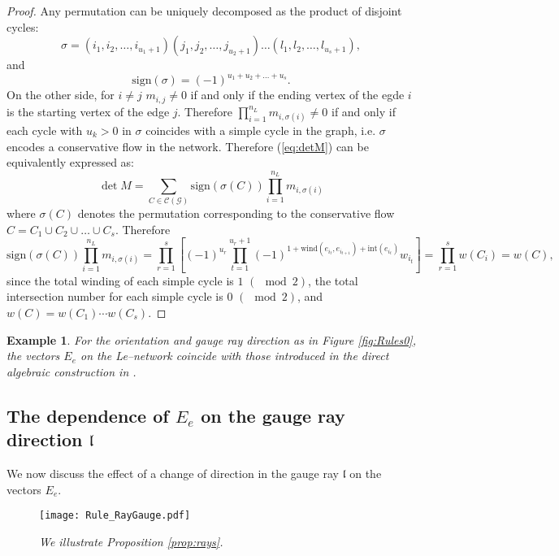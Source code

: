 \documentclass[11pt]{amsart}
\theoremstyle{plain}
\numberwithin{equation}{section}
\newtheorem{example}{Example}[subsection]
\begin{document}
\begin{proof}
Any permutation can be uniquely decomposed as the product of disjoint cycles: 
$$
\sigma=(i_1,i_2,\ldots,i_{u_1+1})(j_1,j_2,\ldots,j_{u_2+1})\ldots(l_1,l_2,\ldots,l_{u_s+1}),
$$ 
and
$$
\mbox{sign}(\sigma)=(-1)^{u_1+u_2+\ldots+u_s}.
$$
On the other side, for $i\ne j$ $m_{i,j}\ne 0$ if and only if the ending vertex of the egde $i$ is the starting vertex of the edge $j$. Therefore $\prod\limits_{i=1}^{n_L} m_{i,\sigma(i)} \ne 0$ if and only if each cycle with $u_k>0$ in $\sigma$ coincides with a simple cycle in the graph, i.e. $\sigma$ encodes a conservative flow in the network. Therefore (\ref{eq:detM}) can be equivalently expressed as:
\begin{equation}
\label{eq:detM1}
\det M =\sum\limits_{C\in {\mathcal C}(\mathcal G)} \mbox{sign}(\sigma(C))\prod\limits_{i=1}^{n_L}m_{i,\sigma(i)}
\end{equation}
where
$\sigma(C)$ denotes the permutation corresponding to the conservative flow $C=C_1\cup C_2\cup\ldots\cup C_s$. Therefore 
\[
\mbox{sign}(\sigma(C))\prod\limits_{i=1}^{n_L}m_{i,\sigma(i)}=\prod\limits_{r=1}^s \left[(-1)^{u_r}\prod\limits_{t=1}^{u_r+1}(-1)^{1+\mbox{wind}(e_{i_t},e_{i_{t+1}})+\mbox{int}(e_{i_t})} w_{i_t}\right]= \prod\limits_{r=1}^s w(C_i)=  w(C),
\]
since the total winding of each simple cycle is $1\,\,(\!\!\!\mod 2)$, the total intersection number for each simple cycle is $0\,\,(\!\!\!\mod 2)$, and $w(C)=w(C_1)\cdots w(C_s)$. 
\end{proof}

\begin{example}
For the orientation and gauge ray direction as in Figure \ref{fig:Rules0}, the vectors $E_e$ on the Le--network coincide with those introduced
in the direct algebraic construction in \cite{AG3}.
\end{example}


\subsection{The dependence of $E_e$ on the gauge ray direction $\mathfrak l$}\label{sec:gauge_ray}
We now discuss the effect of a change of direction in the gauge ray $\mathfrak l$ on the vectors $E_e$. 

\begin{figure}
  \centering
	{\texttt{[image: Rule\_RayGauge.pdf]}}
	\vspace{-.7 truecm}
  \caption{\small{\sl We illustrate Proposition \ref{prop:rays}.}}\label{fig:pivot}
\end{figure}
\end{document}
